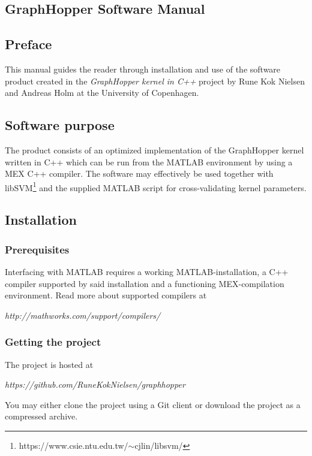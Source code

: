 \documentclass{article}
\begin{document}
\begin{appendices}
\newpage
\section{GraphHopper Software Manual}
\label{appendix:manual}
\subsection{Preface}
This manual guides the reader through installation and use of the software product created in the \textit{GraphHopper kernel in C++} project by Rune Kok Nielsen and Andreas Holm at the University of Copenhagen.
\subsection{Software purpose}
The product consists of an optimized implementation of the GraphHopper kernel written in C++ which can be run from the MATLAB environment by using a MEX C++ compiler. The software may effectively be used together with libSVM\footnote{https://www.csie.ntu.edu.tw/$\sim$cjlin/libsvm/} and the supplied MATLAB script for cross-validating kernel parameters.

\subsection{Installation}
\subsubsection{Prerequisites}
Interfacing with MATLAB requires a working MATLAB-installation, a C++ compiler supported by said installation and a functioning MEX-compilation environment. Read more about supported compilers at

\textit{http://mathworks.com/support/compilers/}
\subsubsection{Getting the project}
The project is hosted at

\textit{https://github.com/RuneKokNielsen/graphhopper}

You may either clone the project using a Git client or download the project as a compressed archive.


\end{appendices}
\end{document}
